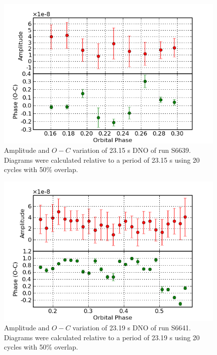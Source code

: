 \begin{figure}
 \centering
 \includegraphics[bb=0 0 600 400,width=0.85\columnwidth]{images/archive_phot/S6639/S6639d_23.15.png}
 \caption[S6639 $O-C$ diagram of 23.15 s DNO]{Amplitude and $O-C$ variation of 23.15 s DNO of run S6639. Diagrams were calculated relative to a period of 23.15 s using 20 cycles with 50\% overlap. }
 \label{S6639_23.15}
\end{figure}



\begin{figure}
 \centering
 \includegraphics[bb=0 0 600 400,width=0.85\columnwidth]{images/archive_phot/S6641/S6641d_23.19.png}
 \caption[S6641 $O-C$ diagram of 23.19 s DNO]{Amplitude and $O-C$ variation of 23.19 s DNO of run S6641. Diagrams were calculated relative to a period of 23.19 s using 20 cycles with 50\% overlap. }
 \label{S6641_23.19}
\end{figure}


